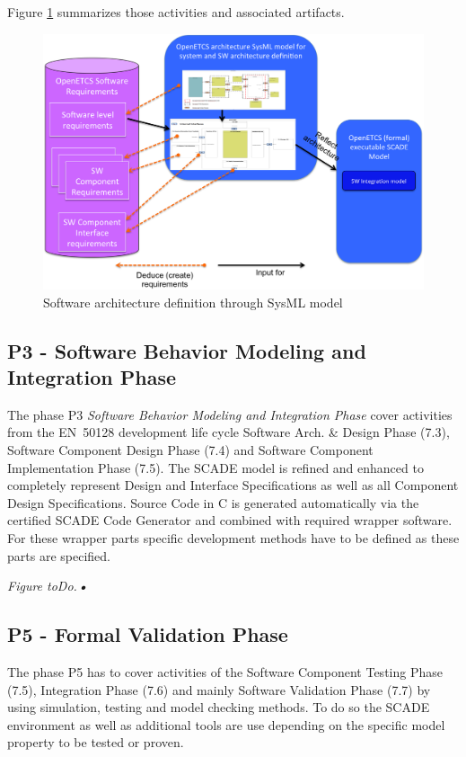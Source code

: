 \documentclass[11pt]{template/openetcs_report}
\begin{document}
Figure \ref{fig:P2SoftwareArchitectureWithSysMLModel} summarizes those activities and associated artifacts.

\begin{figure}[htbp]
\centering
\includegraphics[width=.9\linewidth]
{./images/P2SoftwareArchitectureWithSysMLModel.png}
\caption{\label{fig:P2SoftwareArchitectureWithSysMLModel}Software architecture definition through SysML model}
\end{figure}



\subsection{P3 - Software Behavior Modeling and Integration Phase}

The phase P3 \textit{Software Behavior Modeling and Integration Phase} cover activities from the EN~50128 development life cycle Software Arch. \& Design Phase (7.3), Software Component Design Phase (7.4) and Software Component Implementation Phase (7.5). 
The SCADE model is refined and enhanced to completely represent Design and Interface Specifications as well as all Component Design Specifications. Source Code in C is generated automatically via the certified SCADE Code Generator and combined with required wrapper software. For these wrapper parts specific development methods have to be defined as these parts are specified.

\textit{Figure toDo.\textbf{•}}


\subsection{P5 - Formal Validation Phase}

The phase P5 has to cover activities of the Software Component Testing Phase (7.5), Integration Phase (7.6) and mainly Software Validation Phase (7.7) by using simulation, testing and model checking methods. To do so the SCADE environment as well as additional tools are use depending on the specific model property to be tested or proven. 
\end{document}
